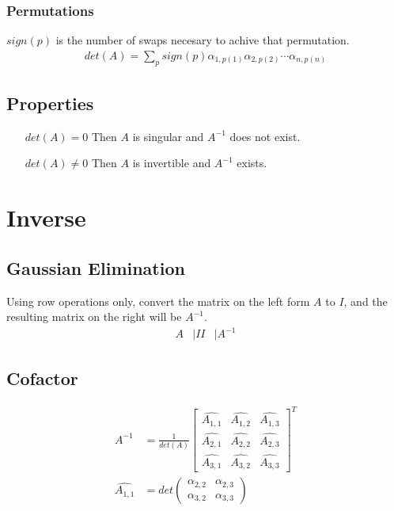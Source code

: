 \documentclass[12pt]{article}
\begin{document}
\subsubsection{Permutations}
$sign(p)$ is the number of swaps necesary to achive that permutation.
\begin{align}
	det(A) = \sum_{p} sign(p)\alpha_{1,p(1)}\alpha_{2,p(2)}\cdots\alpha_{n,p(n)}
\end{align}
\subsection{Properties}
\begin{enumerate}
	\item[$det(A) = 0$] Then $A$ is singular and $A^{-1}$ does not exist.
	\item[$det(A) \neq 0$] Then $A$ is invertible and $A^{-1}$ exists.
\end{enumerate}
\section{Inverse}
\subsection{Gaussian Elimination}
Using row operations only, convert the matrix on the left form $A$ to $I$, and the resulting matrix on the right will be $A^{-1}$.
\begin{align}
	A&\vert I
	I&\vert A^{-1}
\end{align}
\subsection{Cofactor}
\begin{align}
	A^{-1} &= \frac{1}{det(A)} \left[ \begin{array}{ccc}
		\widehat{A_{1,1}} & \widehat{A_{1,2}} & \widehat{A_{1,3}}\\
		\widehat{A_{2,1}} & \widehat{A_{2,2}} & \widehat{A_{2,3}}\\
		\widehat{A_{3,1}} & \widehat{A_{3,2}} & \widehat{A_{3,3}}
	\end{array}\right]^{T}\\
	\widehat{A_{1,1}} &= det \left( \begin{array}{cc}
		\alpha_{2,2} & \alpha_{2,3}\\
		\alpha_{3,2} & \alpha_{3,3}
	\end{array} \right)
\end{align}
\end{document}
